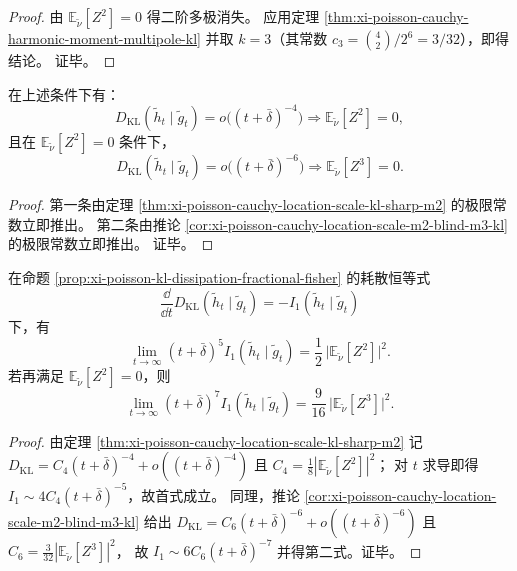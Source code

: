 \begin{proof}
由 \(\mathbb E_{\tilde\nu}[Z^2]=0\) 得二阶多极消失。
应用定理 \ref{thm:xi-poisson-cauchy-harmonic-moment-multipole-kl} 并取 \(k=3\)（其常数 \(c_3=\binom42/2^6=3/32\)），即得结论。
证毕。
\end{proof}

\begin{corollary}[超四次与超六次衰减的层级刚性]\label{cor:xi-poisson-cauchy-location-scale-hierarchy-rigidity}
在上述条件下有：
\[
D_{\mathrm{KL}}(\tilde h_t\mid \tilde g_t)=o\!\bigl((t+\bar\delta)^{-4}\bigr)
\Longrightarrow \mathbb E_{\tilde\nu}[Z^2]=0,
\]
且在 \(\mathbb E_{\tilde\nu}[Z^2]=0\) 条件下，
\[
D_{\mathrm{KL}}(\tilde h_t\mid \tilde g_t)=o\!\bigl((t+\bar\delta)^{-6}\bigr)
\Longrightarrow \mathbb E_{\tilde\nu}[Z^3]=0.
\]
\end{corollary}

\begin{proof}
第一条由定理 \ref{thm:xi-poisson-cauchy-location-scale-kl-sharp-m2} 的极限常数立即推出。
第二条由推论 \ref{cor:xi-poisson-cauchy-location-scale-m2-blind-m3-kl} 的极限常数立即推出。
证毕。
\end{proof}

\begin{corollary}[耗散量的两级锐渐近常数]\label{cor:xi-poisson-cauchy-location-scale-i1-two-level}
在命题 \ref{prop:xi-poisson-kl-dissipation-fractional-fisher} 的耗散恒等式
\[
\frac{\dd}{\dd t}D_{\mathrm{KL}}(\tilde h_t\mid \tilde g_t)=-I_1(\tilde h_t\mid \tilde g_t)
\]
下，有
\[
\lim_{t\to\infty}(t+\bar\delta)^5 I_1(\tilde h_t\mid \tilde g_t)
=\frac12\,\bigl|\mathbb E_{\tilde\nu}[Z^2]\bigr|^2.
\]
若再满足 \(\mathbb E_{\tilde\nu}[Z^2]=0\)，则
\[
\lim_{t\to\infty}(t+\bar\delta)^7 I_1(\tilde h_t\mid \tilde g_t)
=\frac{9}{16}\,\bigl|\mathbb E_{\tilde\nu}[Z^3]\bigr|^2.
\]
\end{corollary}

\begin{proof}
由定理 \ref{thm:xi-poisson-cauchy-location-scale-kl-sharp-m2} 记
\(
D_{\mathrm{KL}}=C_4 (t+\bar\delta)^{-4}+o((t+\bar\delta)^{-4})
\)
且
\(
C_4=\frac18|\mathbb E_{\tilde\nu}[Z^2]|^2
\)；
对 \(t\) 求导即得
\(
I_1\sim 4C_4 (t+\bar\delta)^{-5}
\)，故首式成立。
同理，推论 \ref{cor:xi-poisson-cauchy-location-scale-m2-blind-m3-kl} 给出
\(
D_{\mathrm{KL}}=C_6 (t+\bar\delta)^{-6}+o((t+\bar\delta)^{-6})
\)
且
\(
C_6=\frac{3}{32}|\mathbb E_{\tilde\nu}[Z^3]|^2
\)，
故
\(
I_1\sim 6C_6 (t+\bar\delta)^{-7}
\)
并得第二式。证毕。
\end{proof}

